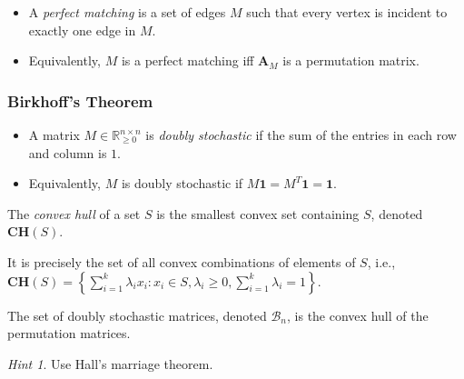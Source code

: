 \documentclass{beamer}
\theoremstyle{remark}
\newtheorem{hint}{Hint}
\newcommand{\rr}{\mathbb{R}}
\newcommand{\ii}{\rr_{\ge 0}}
\newcommand{\birk}{\mathcal{B}}
\newcommand{\biadj}[1]{\mathbf{A}_{#1}}
\newcommand{\ch}[1]{\mathbf{CH}(#1)}
\newcommand{\setcomp}[1]{\left\{#1\right\}}
\begin{document}
\begin{frame}
  \begin{definitions}
    \begin{itemize}
      \item A \emph{perfect matching} is a set of edges $M$ such
            that every vertex is incident to exactly one edge in $M$.
      \item Equivalently, $M$ is a perfect matching iff $\biadj{M}$ is a permutation
            matrix.
    \end{itemize}\end{definitions}
\end{frame}

\begin{frame}[allowframebreaks]
  \frametitle{Birkhoff's Theorem}
  \begin{definition}
    \begin{itemize}
      \item A matrix $M \in \ii^{n \times n}$ is \emph{doubly stochastic} if
            the sum of the entries in each row
            and column is $1$.

      \item Equivalently, $M$ is doubly stochastic if
            $M \mathbf{1} = M^T \mathbf{1} = \mathbf{1}$.
    \end{itemize}
  \end{definition}

  \begin{definition}
    The \emph{convex hull} of a set $S$ is the smallest convex set
    containing $S$, denoted $\ch{S}$.

    It is precisely the set of all convex combinations of elements of $S$,
    i.e., $\ch{S} = \setcomp{\sum_{i = 1}^k \lambda_i x_i : x_i \in S, \lambda_i \ge 0, \sum_{i = 1}^k \lambda_i = 1}$.
  \end{definition}

  \begin{theorem}[Birkhoff, 1946]
    The set of doubly stochastic matrices, denoted $\birk_n$, is the convex hull of the
    permutation matrices.
  \end{theorem}

  \begin{hint}
    Use Hall's marriage theorem.
  \end{hint}
\end{frame}
\end{document}
